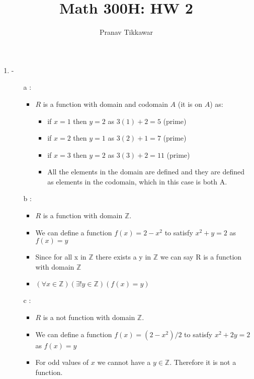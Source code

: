 \documentclass{article}
\author{Pranav Tikkawar}
\title{Math 300H: HW 2}
\begin{document}
\maketitle
\begin{enumerate}
    \item -
    \begin{itemize}
        \item [a]: 
            \begin{itemize}
                \item $R$ is a function with domain and codomain $A$ (it is on $A$) as:\begin{itemize}
                    \item if $x=1$ then $y=2$ as $3(1)+2 = 5 $ (prime)
                    \item if $x=2$ then $y=1$ as $3(2)+1 = 7 $ (prime)
                    \item if $x=3$ then $y=2$ as $3(3)+2 = 11 $ (prime)
                    \item All the elements in the domain are defined and they are defined as elements in the codomain, which in this case is both A.
                    \end{itemize}
            \end{itemize}
        \item [b]:
        \begin{itemize}
            \item $R$ is a function with domain $\mathbb{Z}$. 
            \item We can define a function $f(x) = 2 - x^2$ to satisfy $x^2 + y = 2$ as $ f(x) = y$ 
            \item Since for all x in $\mathbb{Z}$ there exists a y in $\mathbb{Z}$ we can say R is a function with domain $\mathbb{Z}$
            \item $(\forall x \in \mathbb{Z}) (\exists ! y \in \mathbb{Z}) (f(x) = y)$
        \end{itemize}
        \item [c] :
        \begin{itemize}
            \item $R$ is a not function with domain $\mathbb{Z}$. 
            \item We can define a function $f(x) = (2 - x^2)/2$ to satisfy $x^2 + 2y = 2$ as $ f(x) = y$ 
            \item For odd values of $x$ we cannot have a $y \in \mathbb{Z}$. Therefore it is not a function.
        \end{itemize}

\end{itemize}
\end{enumerate}
\end{document}

